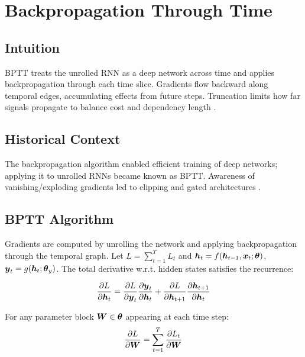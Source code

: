 
\section{Backpropagation Through Time}
\label{sec:bptt}

\subsection*{Intuition}

BPTT treats the unrolled RNN as a deep network across time and applies backpropagation through each time slice. Gradients flow backward along temporal edges, accumulating effects from future steps. Truncation limits how far signals propagate to balance cost and dependency length \cite{GoodfellowEtAl2016}.

\subsection*{Historical Context}

The backpropagation algorithm \cite{Rumelhart1986} enabled efficient training of deep networks; applying it to unrolled RNNs became known as BPTT. Awareness of vanishing/exploding gradients led to clipping and gated architectures \cite{GoodfellowEtAl2016,Hochreiter1997}.


\subsection{BPTT Algorithm}

Gradients are computed by unrolling the network and applying backpropagation through the temporal graph. Let $L=\sum_{t=1}^{T} L_t$ and $\boldsymbol{h}_t = f(\boldsymbol{h}_{t-1}, \boldsymbol{x}_t; \boldsymbol{\theta})$, $\boldsymbol{y}_t = g(\boldsymbol{h}_t; \boldsymbol{\theta}_y)$. The total derivative w.r.t. hidden states satisfies the recurrence:

\begin{equation}
\frac{\partial L}{\partial \boldsymbol{h}_t} = \frac{\partial L}{\partial \boldsymbol{y}_t} \frac{\partial \boldsymbol{y}_t}{\partial \boldsymbol{h}_t} + \frac{\partial L}{\partial \boldsymbol{h}_{t+1}} \frac{\partial \boldsymbol{h}_{t+1}}{\partial \boldsymbol{h}_t}
\end{equation}

For any parameter block $\boldsymbol{W} \in \boldsymbol{\theta}$ appearing at each time step:
\begin{equation}
\frac{\partial L}{\partial \boldsymbol{W}} = \sum_{t=1}^{T} \frac{\partial L_t}{\partial \boldsymbol{W}}
\end{equation}

